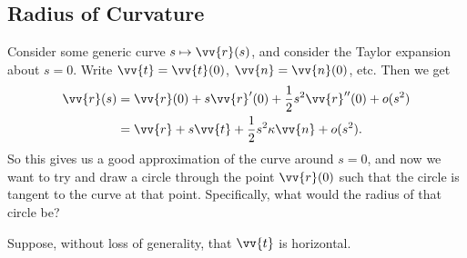 \subsection{Radius of Curvature}

Consider some generic curve $s \mapsto \vv{r}(s)$, and consider the Taylor expansion about $s = 0$. Write $\vv{t} = \vv{t}(0)$, $\vv{n} = \vv{n}(0)$, etc. Then we get
\begin{align*}
	\vv{r}(s) &= \vv{r}(0) + s\vv{r}'(0) + \frac{1}{2}s^2 \vv{r}''(0) + o(s^2) \\
	&= \vv{r} + s\vv{t} + \frac{1}{2}s^2 \kappa \vv{n}	+ o(s^2).
\end{align*}
So this gives us a good approximation of the curve around $s = 0$, and now we want to try and draw a circle through the point $\vv{r}(0)$ such that the circle is tangent to the curve at that point. Specifically, what would the radius of that circle be?

Suppose, without loss of generality, that $\vv{t}$ is horizontal.

